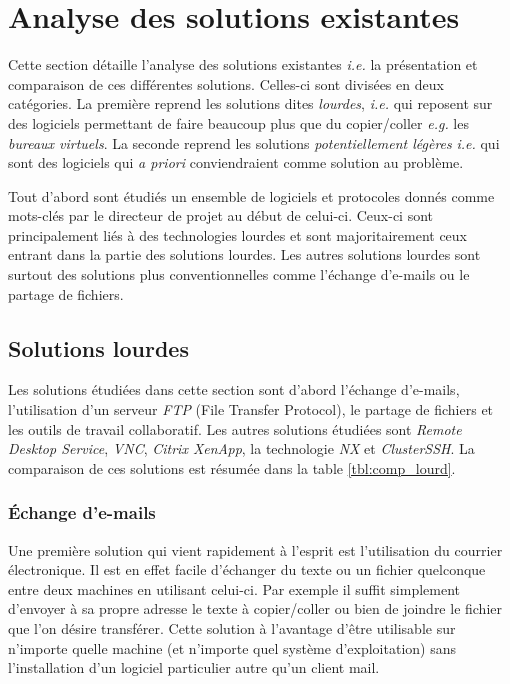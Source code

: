 \chapter{Analyse des solutions existantes}
\renewcommand{\leftmark}{\thechapter.~~Analyse des solutions existantes}
Cette section détaille l'analyse des solutions existantes
\emph{i.e.} la présentation
et comparaison de ces différentes solutions. Celles-ci sont divisées en
deux catégories. La première reprend les solutions dites \emph{lourdes},
\emph{i.e.} qui reposent sur des logiciels permettant de faire
beaucoup plus que du copier/coller \emph{e.g.} les \emph{bureaux virtuels}.
La seconde reprend les solutions \emph{potentiellement légères} \emph{i.e.}
qui sont des logiciels qui \emph{a priori} conviendraient comme solution
au problème.

Tout d'abord sont étudiés un ensemble de logiciels et protocoles
donnés comme mots-clés par le directeur de projet au début de celui-ci.
Ceux-ci sont principalement liés à des technologies lourdes et sont
majoritairement ceux entrant dans la partie des solutions lourdes. Les
autres solutions lourdes sont surtout des solutions plus conventionnelles
comme l'échange d'e-mails ou le partage de fichiers.

\section{Solutions lourdes}
Les solutions étudiées dans cette section sont d'abord l'échange
d'e-mails, l'utilisation d'un serveur \emph{FTP} (File Transfer Protocol),
le partage de fichiers et les outils de travail collaboratif.
Les autres solutions étudiées sont \emph{Remote Desktop Service},
\emph{VNC}, \emph{Citrix XenApp}, la technologie \emph{NX} et
\emph{ClusterSSH}. La comparaison de ces solutions est résumée
dans la table \ref{tbl:comp_lourd}.

\subsection{Échange d'e-mails}
Une première solution qui vient rapidement à l'esprit est l'utilisation
du courrier électronique. Il est en effet facile d'échanger du texte ou
un fichier quelconque entre deux machines en utilisant celui-ci.
Par exemple il suffit simplement d'envoyer à sa propre adresse
le texte à copier/coller ou bien de joindre le fichier que l'on désire
transférer. Cette solution à l'avantage d'être utilisable sur n'importe
quelle machine (et n'importe quel système d'exploitation) sans l'installation
d'un logiciel particulier autre qu'un client mail.

